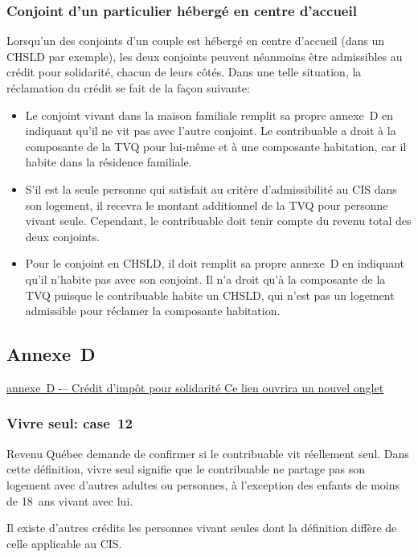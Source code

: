 \subsubsection{Conjoint d'un particulier hébergé en centre d'accueil}
Lorsqu'un des conjoints d'un couple est hébergé en centre d'accueil (dans un CHSLD par exemple), les deux conjoints peuvent néanmoins être admissibles au crédit pour solidarité, chacun de leurs côtés. Dans une telle situation, la réclamation du crédit se fait de la façon suivante:
\begin{itemize}
	\item Le conjoint vivant dans la maison familiale remplit sa propre annexe~D en indiquant qu'il ne vit pas avec l'autre conjoint. Le contribuable a droit à la composante de la TVQ pour lui-même et à une composante habitation, car il habite dans la résidence familiale.
	\item S'il est la seule personne qui satisfait au critère d'admissibilité au CIS dans son logement, il recevra le montant additionnel de la TVQ pour personne vivant seule. Cependant, le contribuable doit tenir compte du revenu total des deux conjoints.
	\item Pour le conjoint en CHSLD, il doit remplit sa propre annexe~D en indiquant qu'il n'habite pas avec son conjoint. Il n'a droit qu'à la composante de la TVQ puisque le contribuable habite un CHSLD, qui n'est pas un logement admissible pour réclamer la composante habitation. 
\end{itemize}


\subsection{Annexe~D}
\href{https://www.revenuquebec.ca/documents/fr/formulaires/tp/2023-12/TP-1.D.D%282023-12%29.pdf}{annexe~D -– Crédit d'impôt pour solidarité Ce lien ouvrira un nouvel onglet}

\subsubsection{Vivre seul: case~12}
Revenu Québec demande de confirmer si le contribuable vit réellement seul. Dans cette définition, \og vivre seul \fg{} signifie que le contribuable ne partage pas son logement avec d'autres adultes ou personnes, à l'exception des enfants de moins de 18~ans vivant avec lui.

Il existe d'autres crédits les personnes vivant seules dont la définition diffère de celle applicable au CIS.

